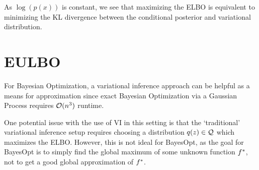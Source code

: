 \documentclass[11pt]{article}
\numberwithin{figure}{section}
\numberwithin{equation}{section}
\begin{document}
As $\log(p(x))$ is constant, we see that maximizing the ELBO is equivalent to minimizing the KL divergence between the conditional posterior and variational distribution. 

\section{EULBO}
For Bayesian Optimization, a variational inference approach can be helpful as a means for approximation since exact Bayesian Optimization via a Gaussian Process requires $\mathcal{O}(n^3)$ runtime.

One potential issue with the use of VI in this setting is that the `traditional' variational inference setup requires choosing a distribution $q(z) \in \mathcal{Q}$ which maximizes the ELBO. However, this is not ideal for BayesOpt, as the goal for BayesOpt is to simply find the global maximum of some unknown function $f^{*}$, not to get a good global approximation of $f^{*}$. 
\end{document}
